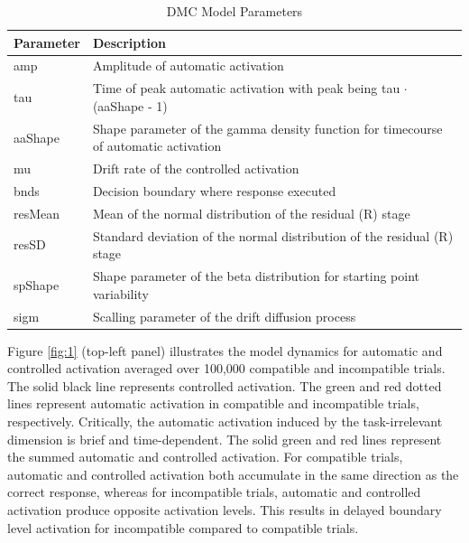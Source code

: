 \begin{table}
    \centering
    \caption{DMC Model Parameters}
    \begin{tabular}{ll}
        \hline
        Parameter&Description \\ 
        \hline
        amp & Amplitude of automatic activation\\ 
        tau & Time of peak automatic activation with peak being tau $\cdot$ (aaShape - 1) \\ 
        aaShape & Shape parameter of the gamma density function for timecourse of automatic activation \\ 
        mu & Drift rate of the controlled activation \\ 
        bnds & Decision boundary where response executed \\ 
        resMean & Mean of the normal distribution of the residual (R) stage \\ 
        resSD & Standard deviation of the normal distribution of the residual (R) stage \\ 
        spShape & Shape parameter of the beta distribution for starting point variability \\ 
        sigm & Scalling parameter of the drift diffusion process \\ 
        \hline
    \end{tabular}
    \label{tab:dmc_parameters}
\end{table}

Figure \ref{fig:1} (top-left panel) illustrates the model dynamics for
automatic and controlled activation averaged over 100,000 compatible and
incompatible trials. The solid black line represents controlled activation. The
green and red dotted lines represent automatic activation in compatible and
incompatible trials, respectively. Critically, the automatic activation induced
by the task-irrelevant dimension is brief and time-dependent. The solid green
and red lines represent the summed automatic and controlled activation. For
compatible trials, automatic and controlled activation both accumulate in the
same direction as the correct response, whereas for incompatible trials,
automatic and controlled activation produce opposite activation levels. This
results in delayed boundary level activation for incompatible compared to
compatible trials.

